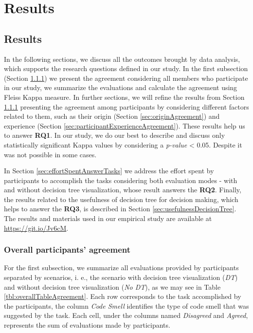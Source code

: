 \chapter{Results}

\section{Results}
\label{sec:results}

In the following sections, we discuss all the outcomes brought by data analysis, which supports the research questions defined in our study. In the first subsection (Section \ref{sec:overalAgreement}) we present the agreement considering all members who participate in our study, we summarize the evaluations and calculate the agreement using Fleiss Kappa measure. In further sections, we will refine the results from Section \ref{sec:overalAgreement} presenting the agreement among participants by considering different factors related to them, such as their origin (Section \ref{sec:originAgreement}) and experience (Section \ref{sec:participantExperienceAgreement}). These results help us to answer \textbf{RQ1}. In our study, we do our best to describe and discuss only statistically significant Kappa values by considering a \textit{p-value} < 0.05. Despite it was not possible in some cases.

In Section \ref{sec:effortSpentAnswerTasks} we address the effort spent by participants to accomplish the tasks considering both evaluation modes - with and without decision tree visualization, whose result answers the  \textbf{RQ2}. Finally, the results related to the usefulness of decision tree for decision making, which helps to answer the \textbf{RQ3}, is described in Section \ref{sec:usefulnessDecisionTree}. The results and materials used in our empirical study are available at \hyperlink{https://git.io/Jv6cM}{https://git.io/Jv6cM}.

\subsection{Overall participants' agreement} \label{sec:overalAgreement}

For the first subsection, we summarize all evaluations provided by participants separated by scenarios, i. e., the scenario with decision tree visualization (\textit{DT}) and without decision tree visualization (\textit{No DT}), as we may see in Table \ref{tbl:overallTableAgreement}. Each row corresponds to the task accomplished by the participants, the column \textit{Code Smell} identifies the type of code smell that was suggested by the task. Each cell, under the columns named \textit{Disagreed} and \textit{Agreed}, represents the sum of evaluations made by participants.

